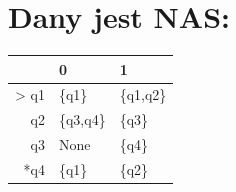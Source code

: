 \documentclass[a4paper,11pt]{article}
\begin{document}
\section{Dany jest NAS:}
\begin{center}
	\begin{tabular}{rcc}
		\hline
		\multicolumn{1}{|r|}{}     & \multicolumn{1}{l|}{0}         & \multicolumn{1}{l|}{1}         \\ \hline
		\multicolumn{1}{|r|}{> q1} & \multicolumn{1}{l|}{\{q1\}}    & \multicolumn{1}{l|}{\{q1,q2\}} \\ \hline
		\multicolumn{1}{|r|}{q2}   & \multicolumn{1}{l|}{\{q3,q4\}} & \multicolumn{1}{l|}{\{q3\}}    \\ \hline
		\multicolumn{1}{|r|}{q3}   & \multicolumn{1}{l|}{None}      & \multicolumn{1}{l|}{\{q4\}}    \\ \hline
		\multicolumn{1}{|r|}{*q4}  & \multicolumn{1}{l|}{\{q1\}}    & \multicolumn{1}{l|}{\{q2\}}    \\ \hline
	\end{tabular}
\end{center}
\end{document}
